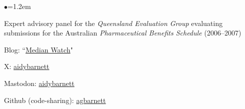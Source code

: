 \documentclass[a4paper,11pt]{article}
\renewcommand{\labelitemi}{$\bullet$}
\begin{document}
\begin{raggedright}
\begin{list}{\labelitemi}{\leftmargin=1.2em}
\item Expert advisory panel for the \textit{Queensland Evaluation Group} evaluating submissions for the Australian \textit{Pharmaceutical Benefits Schedule} (2006--2007)
\item Blog: ``\href{https://medianwatch.netlify.app/}{Median Watch}"
\item X: \href{https://twitter.com/aidybarnett}{aidybarnett}
\item Mastodon: \href{https://fediscience.org/@aidybarnett}{aidybarnett}
\item Github (code-sharing): \href{https://github.com/agbarnett}{agbarnett}
\end{list}


\end{raggedright}
\end{document}
